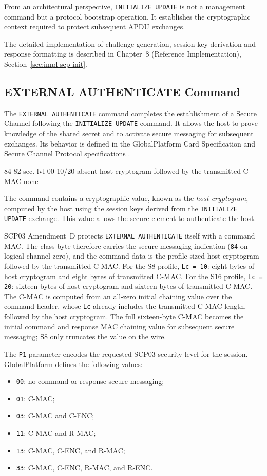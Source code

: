 From an architectural perspective, \texttt{INITIALIZE UPDATE} is not a
management command but a protocol bootstrap operation. It establishes the
cryptographic context required to protect subsequent APDU exchanges.

The detailed implementation of challenge generation, session key derivation and
response formatting is described in Chapter~8 (Reference Implementation),
Section~\ref{sec:impl-scp-init}.

\subsection{EXTERNAL AUTHENTICATE Command}

The \texttt{EXTERNAL AUTHENTICATE} command completes the establishment of a
Secure Channel following the \texttt{INITIALIZE UPDATE} command. It allows the
host to prove knowledge of the shared secret and to activate secure messaging
for subsequent exchanges. Its behavior is defined in the GlobalPlatform Card
Specification and Secure Channel Protocol specifications 
.

\apdudesc
{84}
{82}
{sec. lvl}
{00}
{10/20}
{absent}
{host cryptogram followed by the transmitted C-MAC}
{none}

The command contains a cryptographic value, known as the \emph{host
cryptogram}, computed by the host using the session keys derived from the
\texttt{INITIALIZE UPDATE} exchange.  This value allows the secure element to
authenticate the host.

SCP03 Amendment~D protects \texttt{EXTERNAL AUTHENTICATE} itself with a
command MAC. The class byte therefore carries the secure-messaging indication
(\texttt{84} on logical channel zero), and the command data is the
profile-sized host cryptogram followed by the transmitted C-MAC. For the S8
profile, \texttt{Lc = 10}: eight bytes of host cryptogram and eight bytes of
transmitted C-MAC. For the S16 profile, \texttt{Lc = 20}: sixteen bytes of host
cryptogram and sixteen bytes of transmitted C-MAC. The C-MAC is computed from
an all-zero initial chaining value over the command header, whose \texttt{Lc}
already includes the transmitted C-MAC length, followed by the host cryptogram.
The full sixteen-byte C-MAC becomes the initial command and response MAC
chaining value for subsequent secure messaging; S8 only truncates the value on
the wire.

The \texttt{P1} parameter encodes the requested SCP03 security level for the
session. GlobalPlatform defines the following values:
\begin{itemize}
\item \texttt{00}: no command or response secure messaging;
\item \texttt{01}: C-MAC;
\item \texttt{03}: C-MAC and C-ENC;
\item \texttt{11}: C-MAC and R-MAC;
\item \texttt{13}: C-MAC, C-ENC, and R-MAC;
\item \texttt{33}: C-MAC, C-ENC, R-MAC, and R-ENC.
\end{itemize}

